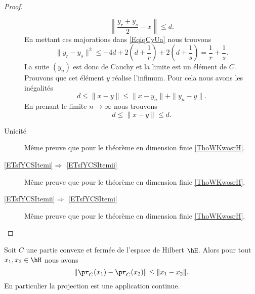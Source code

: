 \begin{proof}
\begin{description}
\begin{equation}
        \left\| \frac{ y_r+y_s }{2}-x \right\| \leq d.
    \end{equation}
    En mettant ces majorations dans \eqref{EqiqCyUa} nous trouvons
    \begin{equation}
        \| y_r-y_s \|^2\leq -4d+2\left( d+\frac{1}{ r } \right)+2\left( d+\frac{1}{ s } \right)=\frac{1}{ r }+\frac{1}{ s }.
    \end{equation}
    La suite \( (y_n)\) est donc de Cauchy et la limite est un élément de \( C\). Prouvons que cet élément \( y\) réalise l'infimum. Pour cela nous avons les inégalités
    \begin{equation}
        d\leq \| x-y \|\leq\| x-y_n \|+\| y_n-y \|.
    \end{equation}
    En prenant le limite \( n\to\infty\) nous trouvons
    \begin{equation}
        d\leq \| x-y \|\leq d.
    \end{equation}
    
        \item[Unicité]

            Même preuve que pour le théorème en dimension finie \ref{ThoWKwosrH}.

        \item[\ref{ETsfYCSItemi}\( \Rightarrow\) \ref{ETsfYCSItemii}]
                
            Même preuve que pour le théorème en dimension finie \ref{ThoWKwosrH}.
        \item[\ref{ETsfYCSItemii}\( \Rightarrow\) \ref{ETsfYCSItemi}]

            Même preuve que pour le théorème en dimension finie \ref{ThoWKwosrH}.

    \end{description}
\end{proof}

\begin{proposition}     \label{PropAXJpCe}
    Soit \( C\) une partie convexe et fermée de l'espace de Hilbert \( \hH\). Alors pour tout \( x_1,x_2\in\hH\) nous avons
    \begin{equation}
        \| \pr_C(x_1)-\pr_C(x_2) \|\leq \| x_1-x_2 \|.
    \end{equation}
    En particulier la projection est une application continue.
\end{proposition}


